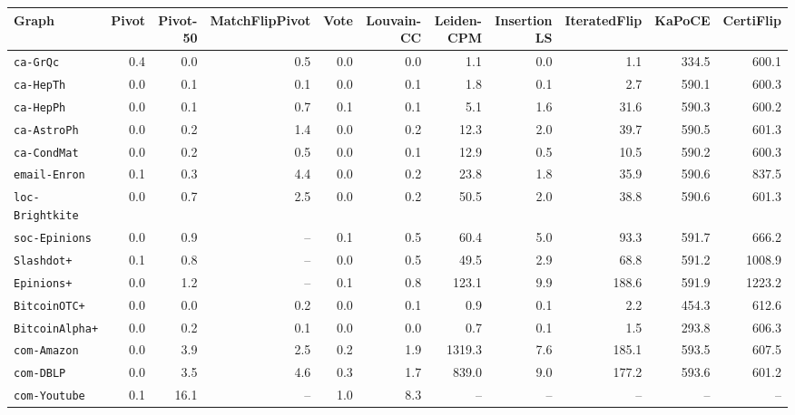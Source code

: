 \begin{tabular}{lrrrrrrrrrr}
\toprule
Graph & Pivot & Pivot-50 & MatchFlipPivot & Vote & Louvain-CC & Leiden-CPM & Insertion LS & IteratedFlip & KaPoCE & CertiFlip\\
\midrule
\texttt{ca-GrQc} & 0.4 & 0.0 & 0.5 & 0.0 & 0.0 & 1.1 & 0.0 & 1.1 & 334.5 & 600.1\\
\texttt{ca-HepTh} & 0.0 & 0.1 & 0.1 & 0.0 & 0.1 & 1.8 & 0.1 & 2.7 & 590.1 & 600.3\\
\texttt{ca-HepPh} & 0.0 & 0.1 & 0.7 & 0.1 & 0.1 & 5.1 & 1.6 & 31.6 & 590.3 & 600.2\\
\texttt{ca-AstroPh} & 0.0 & 0.2 & 1.4 & 0.0 & 0.2 & 12.3 & 2.0 & 39.7 & 590.5 & 601.3\\
\texttt{ca-CondMat} & 0.0 & 0.2 & 0.5 & 0.0 & 0.1 & 12.9 & 0.5 & 10.5 & 590.2 & 600.3\\
\texttt{email-Enron} & 0.1 & 0.3 & 4.4 & 0.0 & 0.2 & 23.8 & 1.8 & 35.9 & 590.6 & 837.5\\
\texttt{loc-Brightkite} & 0.0 & 0.7 & 2.5 & 0.0 & 0.2 & 50.5 & 2.0 & 38.8 & 590.6 & 601.3\\
\texttt{soc-Epinions} & 0.0 & 0.9 & -- & 0.1 & 0.5 & 60.4 & 5.0 & 93.3 & 591.7 & 666.2\\
\texttt{Slashdot+} & 0.1 & 0.8 & -- & 0.0 & 0.5 & 49.5 & 2.9 & 68.8 & 591.2 & 1008.9\\
\texttt{Epinions+} & 0.0 & 1.2 & -- & 0.1 & 0.8 & 123.1 & 9.9 & 188.6 & 591.9 & 1223.2\\
\texttt{BitcoinOTC+} & 0.0 & 0.0 & 0.2 & 0.0 & 0.1 & 0.9 & 0.1 & 2.2 & 454.3 & 612.6\\
\texttt{BitcoinAlpha+} & 0.0 & 0.2 & 0.1 & 0.0 & 0.0 & 0.7 & 0.1 & 1.5 & 293.8 & 606.3\\
\texttt{com-Amazon} & 0.0 & 3.9 & 2.5 & 0.2 & 1.9 & 1319.3 & 7.6 & 185.1 & 593.5 & 607.5\\
\texttt{com-DBLP} & 0.0 & 3.5 & 4.6 & 0.3 & 1.7 & 839.0 & 9.0 & 177.2 & 593.6 & 601.2\\
\texttt{com-Youtube} & 0.1 & 16.1 & -- & 1.0 & 8.3 & -- & -- & -- & -- & --\\
\bottomrule
\end{tabular}
